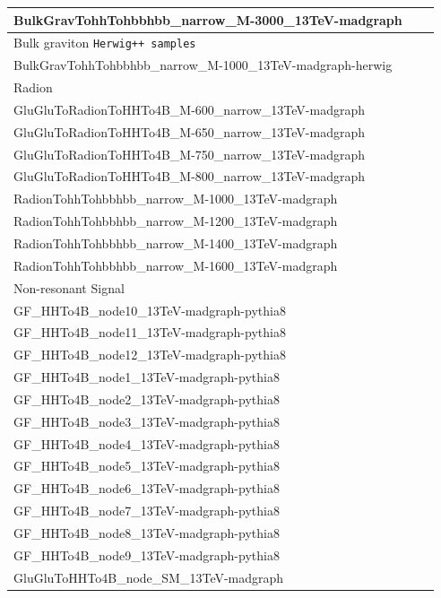 \begin{table}[htb]
\begin{center}
\begin{tabular}{l|c|c}
      {BulkGravTohhTohbbhbb\_narrow\_M-3000\_13TeV-madgraph} \\
      \hline
      Bulk graviton \texttt{Herwig++ samples} \\
      {BulkGravTohhTohbbhbb\_narrow\_M-1000\_13TeV-madgraph-herwig}  \\
      \hline
      Radion \\ 
      \hline
      {GluGluToRadionToHHTo4B\_M-600\_narrow\_13TeV-madgraph}  \\
      {GluGluToRadionToHHTo4B\_M-650\_narrow\_13TeV-madgraph} \\
      {GluGluToRadionToHHTo4B\_M-750\_narrow\_13TeV-madgraph} \\
      {GluGluToRadionToHHTo4B\_M-800\_narrow\_13TeV-madgraph}  \\
      {RadionTohhTohbbhbb\_narrow\_M-1000\_13TeV-madgraph} \\
      {RadionTohhTohbbhbb\_narrow\_M-1200\_13TeV-madgraph} \\
      {RadionTohhTohbbhbb\_narrow\_M-1400\_13TeV-madgraph} \\
      {RadionTohhTohbbhbb\_narrow\_M-1600\_13TeV-madgraph}  \\
      \hline
      Non-resonant Signal \\ 
      \hline
      GF\_HHTo4B\_node10\_13TeV-madgraph-pythia8\\
      GF\_HHTo4B\_node11\_13TeV-madgraph-pythia8\\
      GF\_HHTo4B\_node12\_13TeV-madgraph-pythia8\\
      GF\_HHTo4B\_node1\_13TeV-madgraph-pythia8\\
      GF\_HHTo4B\_node2\_13TeV-madgraph-pythia8\\
      GF\_HHTo4B\_node3\_13TeV-madgraph-pythia8\\
      GF\_HHTo4B\_node4\_13TeV-madgraph-pythia8\\
      GF\_HHTo4B\_node5\_13TeV-madgraph-pythia8\\
      GF\_HHTo4B\_node6\_13TeV-madgraph-pythia8\\
      GF\_HHTo4B\_node7\_13TeV-madgraph-pythia8\\
      GF\_HHTo4B\_node8\_13TeV-madgraph-pythia8\\
      GF\_HHTo4B\_node9\_13TeV-madgraph-pythia8\\
      GluGluToHHTo4B\_node\_SM\_13TeV-madgraph  \\

\end{tabular}
\end{center}
\end{table}
